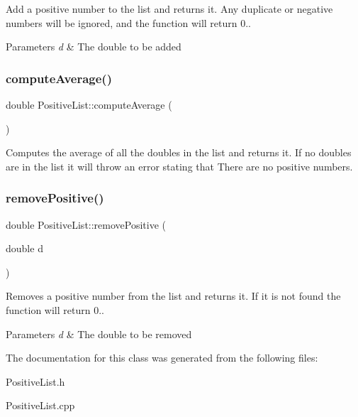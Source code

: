 Add a positive number to the list and returns it. Any duplicate or negative numbers will be ignored, and the function will return 0.. 
\begin{DoxyParams}{Parameters}
{\em d} & The double to be added \\
\hline
\end{DoxyParams}
\hypertarget{classasst04_1_1_positive_list_a3bc00641ab483f3b84c720bf28d250df}{}\label{classasst04_1_1_positive_list_a3bc00641ab483f3b84c720bf28d250df} 
\subsubsection{\texorpdfstring{compute\+Average()}{computeAverage()}}
{\footnotesize\ttfamily double Positive\+List\+::compute\+Average (\begin{DoxyParamCaption}{ }\end{DoxyParamCaption})}

Computes the average of all the doubles in the list and returns it. If no doubles are in the list it will throw an error stating that \textquotesingle{}There are no positive numbers\textquotesingle{}. \hypertarget{classasst04_1_1_positive_list_a6c769f11952005e6edb5293bc80666d6}{}\label{classasst04_1_1_positive_list_a6c769f11952005e6edb5293bc80666d6} 
\subsubsection{\texorpdfstring{remove\+Positive()}{removePositive()}}
{\footnotesize\ttfamily double Positive\+List\+::remove\+Positive (\begin{DoxyParamCaption}\item[{double}]{d }\end{DoxyParamCaption})}

Removes a positive number from the list and returns it. If it is not found the function will return 0.. 
\begin{DoxyParams}{Parameters}
{\em d} & The double to be removed \\
\hline
\end{DoxyParams}


The documentation for this class was generated from the following files\+:\begin{DoxyCompactItemize}
\item 
Positive\+List.\+h\item 
Positive\+List.\+cpp\end{DoxyCompactItemize}

